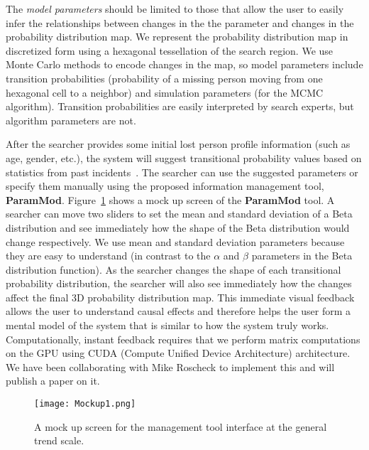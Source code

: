 The \textit{model parameters} should be limited to those that allow the user to easily infer the relationships between changes in the the parameter and changes in the probability distribution map. We represent the probability distribution map in discretized form using a hexagonal tessellation of the search region. We use Monte Carlo methods to encode changes in the map, so model parameters include transition probabilities (probability of a missing person moving from one hexagonal cell to a neighbor) and simulation parameters (for the MCMC algorithm). Transition probabilities are easily interpreted by search experts, but algorithm parameters are not.

After the searcher provides some initial lost person profile information (such as age, gender, etc.), the system will suggest transitional probability values based on statistics from past incidents~\cite{Koester2008Lost}. The searcher can use the suggested parameters or specify them manually using the proposed information management tool, \textbf{ParamMod}. Figure~\ref{Mockup1} shows a mock up screen of the \textbf{ParamMod} tool. A searcher can move two sliders to set the mean and standard deviation of a Beta distribution and see immediately how the shape of the Beta distribution would change respectively. We use mean and standard deviation parameters because they are easy to understand (in contrast to the $\alpha$ and $\beta$ parameters in the Beta distribution function). As the searcher changes the shape of each transitional probability distribution, the searcher will also see immediately how the changes affect the final 3D probability distribution map. This immediate visual feedback allows the user to understand causal effects and therefore helps the user form a mental model of the system that is similar to how the system truly works. Computationally, instant feedback requires that we perform matrix computations on the GPU using CUDA (Compute Unified Device Architecture) architecture. We have been collaborating with Mike Roscheck to implement this and will publish a paper on it.

\begin{figure}
\centering
\texttt{[image: Mockup1.png]}
\caption{A mock up screen for the management tool interface at the general trend scale.}
\label{Mockup1}
\end{figure}

